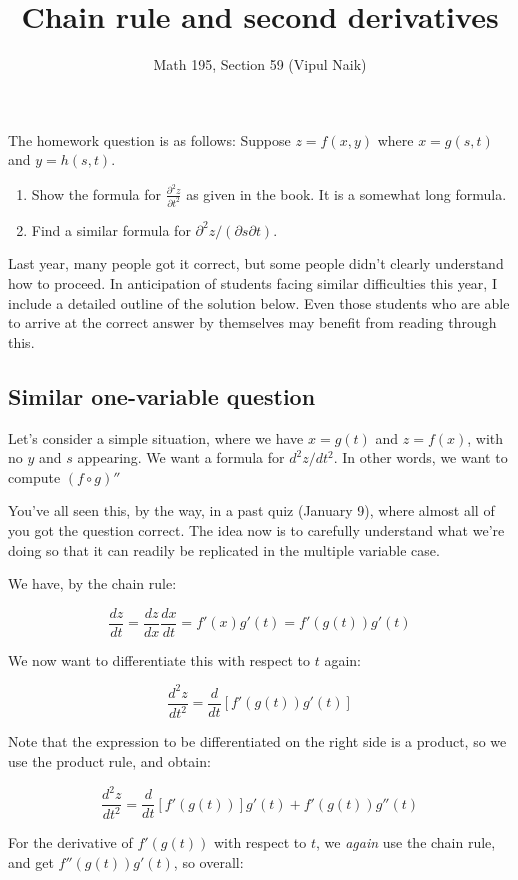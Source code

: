 \documentclass[10pt]{amsart}
\title{Chain rule and second derivatives}
\author{Math 195, Section 59 (Vipul Naik)}
\begin{document}
\maketitle

The homework question is as follows: Suppose $z = f(x,y)$ where $x =
g(s,t)$ and $y = h(s,t)$.

\begin{enumerate}
\item Show the formula for $\frac{\partial^2z}{\partial t^2}$ as
  given in the book. It is a somewhat long formula.
\item Find a similar formula for $\partial^2z/(\partial s\partial
  t)$.
\end{enumerate}

Last year, many people got it correct, but some people didn't clearly
understand how to proceed.  In anticipation of students facing similar
difficulties this year, I include a detailed outline of the solution
below. Even those students who are able to arrive at the correct
answer by themselves may benefit from reading through this.

\subsection*{Similar one-variable question}

Let's consider a simple situation, where we have $x = g(t)$ and $z =
f(x)$, with no $y$ and $s$ appearing. We want a formula for
$d^2z/dt^2$. In other words, we want to compute $(f \circ g)''$

You've all seen this, by the way, in a past quiz (January 9), where
almost all of you got the question correct. The idea now is to
carefully understand what we're doing so that it can readily be
replicated in the multiple variable case.

We have, by the chain rule:

$$\frac{dz}{dt} = \frac{dz}{dx}\frac{dx}{dt} = f'(x)g'(t) = f'(g(t))g'(t)$$

We now want to differentiate this with respect to $t$ again:

$$\frac{d^2z}{dt^2} = \frac{d}{dt}[f'(g(t))g'(t)]$$

Note that the expression to be differentiated on the right side is a
product, so we use the product rule, and obtain:

$$\frac{d^2z}{dt^2} = \frac{d}{dt}[f'(g(t))]g'(t) + f'(g(t))g''(t)$$

For the derivative of $f'(g(t))$ with respect to $t$, we {\em again}
use the chain rule, and get $f''(g(t))g'(t)$, so overall:
\end{document}
